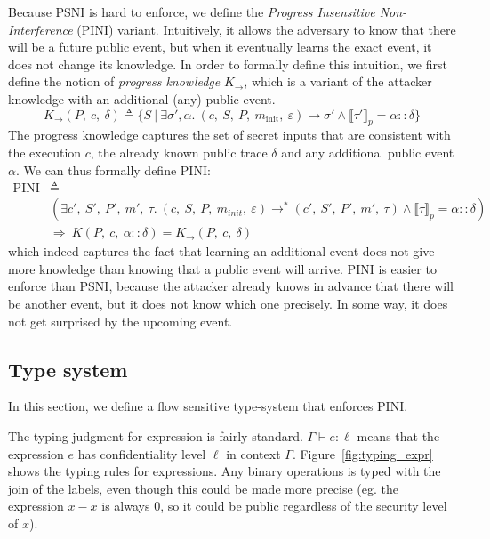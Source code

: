 \documentclass[10pt]{article}
\newcommand{\ctx}{\Gamma}
\newcommand{\conf}{\sigma}
\newcommand{\exec}[2] { #1 \rightarrow #2 }
\newcommand{\exectrans}[2] { #1 \rightarrow^{*} #2 }
\newcommand{\pproj}[1]{\llbracket #1 \rrbracket_{p}}
\newcommand{\etyping}[3]{ #1 \vdash #2 : #3}
\begin{document}
Because PSNI is hard to enforce, we define the \emph{Progress Insensitive Non-Interference} (PINI)
variant. Intuitively, it allows the adversary to know that there will be a future public event, but
when it eventually learns the exact event, it does not change its knowledge. In order to formally
define this intuition, we first define the notion of \emph{progress knowledge} $K_{\rightarrow}$,
which is a variant of the attacker knowledge with an additional (any) public event.
\[
  K_{\rightarrow}(P,~c,~\delta) \triangleq
  \{ S ~|~ \exists \conf',\alpha.\
  \exec{(c,~S,~P,~m_{\mathrm{init}},~\varepsilon)}{\conf'}
  \wedge
  \pproj{\tau'} = \alpha::\delta
  \}
\]
The progress knowledge captures the set of secret inputs that are consistent with the execution $c$,
the already known public trace $\delta$ and any additional public event $\alpha$.
We can thus formally define PINI:
\begin{align*}
  \mathrm{PINI} &\triangleq \\
  &(\exists c',~S',~P',~m',~\tau.\
  \exectrans{(c,~S,~P,~m_{init},~\varepsilon)}{(c',~S',~P',~m',~\tau)}
  \wedge
  \pproj{\tau} = \alpha::\delta) \\
  &\Rightarrow
  \ K(P,~c,~\alpha::\delta) = K_{\rightarrow}(P,~c,~\delta)
\end{align*}
which indeed captures the fact that learning an additional event does not give more knowledge than
knowing that a public event will arrive.
PINI is easier to enforce than PSNI, because the attacker already knows in advance that there will
be another event, but it does not know which one precisely. In some way, it does not get surprised
by the upcoming event.

\subsection{Type system}%
\label{subsec:type_system}
In this section, we define a flow sensitive type-system that enforces PINI.

The typing judgment for expression is fairly standard. \( \etyping{\ctx}{e}{\ell} \) means that
the expression \( e \) has confidentiality level \( \ell \) in context \( \ctx \).
Figure~\ref{fig:typing_expr} shows the typing rules for expressions. Any binary operations is typed
with the join of the labels, even though this could be made more precise (eg. the expression $x - x$ is
always 0, so it could be public regardless of the security level of $x$).


\end{document}
